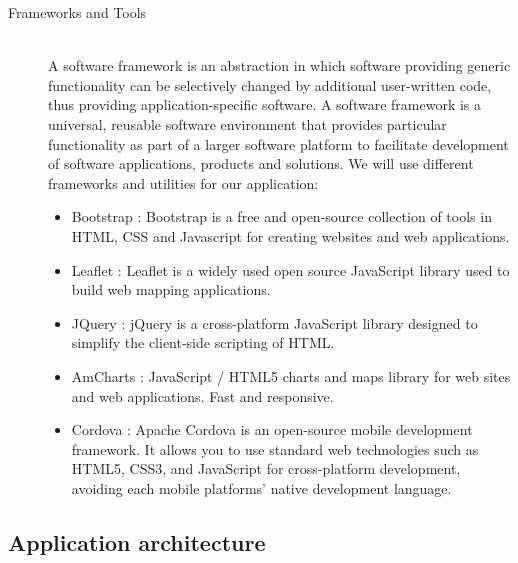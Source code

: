 \begin{description}
  \item[Frameworks and Tools] \hfill \\
    A software framework is an abstraction in which software providing generic functionality can be selectively changed by additional user-written code, thus providing application-specific software. A software framework is a universal, reusable software environment that provides particular functionality as part of a larger software platform to facilitate development of software applications, products and solutions. We will use different frameworks and utilities for our application:
    \begin{itemize}
      \item Bootstrap : Bootstrap is a free and open-source collection of tools in HTML, CSS and Javascript for creating websites and web applications.
      \item Leaflet : Leaflet is a widely used open source JavaScript library used to build web mapping applications.
      \item JQuery : jQuery is a cross-platform JavaScript library designed to simplify the client-side scripting of HTML.
      \item AmCharts : JavaScript / HTML5 charts and maps library for web sites and web applications. Fast and responsive.
      \item Cordova : Apache Cordova is an open-source mobile development framework. It allows you to use standard web technologies such as HTML5, CSS3, and JavaScript for cross-platform development, avoiding each mobile platforms' native development language.
    \end{itemize}

\end{description}



\subsection{Application architecture}


